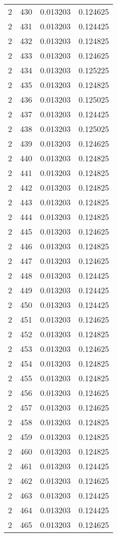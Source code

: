 \begin{longtable}{rrrr}
2 & 430 & 0.013203 & 0.124625 \\
2 & 431 & 0.013203 & 0.124425 \\
2 & 432 & 0.013203 & 0.124825 \\
2 & 433 & 0.013203 & 0.124625 \\
2 & 434 & 0.013203 & 0.125225 \\
2 & 435 & 0.013203 & 0.124825 \\
2 & 436 & 0.013203 & 0.125025 \\
2 & 437 & 0.013203 & 0.124425 \\
2 & 438 & 0.013203 & 0.125025 \\
2 & 439 & 0.013203 & 0.124625 \\
2 & 440 & 0.013203 & 0.124825 \\
2 & 441 & 0.013203 & 0.124825 \\
2 & 442 & 0.013203 & 0.124825 \\
2 & 443 & 0.013203 & 0.124825 \\
2 & 444 & 0.013203 & 0.124825 \\
2 & 445 & 0.013203 & 0.124625 \\
2 & 446 & 0.013203 & 0.124825 \\
2 & 447 & 0.013203 & 0.124625 \\
2 & 448 & 0.013203 & 0.124425 \\
2 & 449 & 0.013203 & 0.124425 \\
2 & 450 & 0.013203 & 0.124425 \\
2 & 451 & 0.013203 & 0.124625 \\
2 & 452 & 0.013203 & 0.124825 \\
2 & 453 & 0.013203 & 0.124625 \\
2 & 454 & 0.013203 & 0.124825 \\
2 & 455 & 0.013203 & 0.124825 \\
2 & 456 & 0.013203 & 0.124625 \\
2 & 457 & 0.013203 & 0.124625 \\
2 & 458 & 0.013203 & 0.124825 \\
2 & 459 & 0.013203 & 0.124825 \\
2 & 460 & 0.013203 & 0.124825 \\
2 & 461 & 0.013203 & 0.124425 \\
2 & 462 & 0.013203 & 0.124625 \\
2 & 463 & 0.013203 & 0.124425 \\
2 & 464 & 0.013203 & 0.124425 \\
2 & 465 & 0.013203 & 0.124625 \\

\end{longtable}
